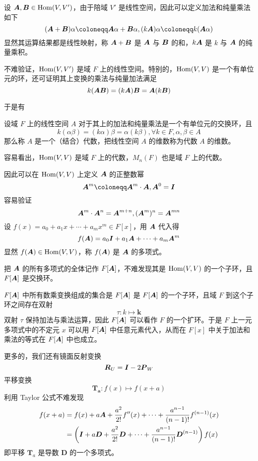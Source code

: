 设 $\boldsymbol{A},\boldsymbol{B} \in \operatorname{Hom} (V,V')$，由于陪域 $V'$ 是线性空间，因此可以定义加法和纯量乘法如下
\[ (\bfA + \bfB) \alpha \coloneqq \bfA\alpha + \bfB\alpha, (k\bfA)\alpha \coloneqq k(\bfA \alpha) \]
显然其运算结果都是线性映射，称 $\boldsymbol{A} + \boldsymbol{B}$ 是 $\boldsymbol{A}$ 与 $\boldsymbol{B}$ 的和，$k\boldsymbol{A}$ 是 $k$ 与 $\boldsymbol{A}$ 的纯量乘积。

不难验证，$\operatorname{Hom}(V,V')$ 是域 $F$ 上的线性空间。特别的，$\operatorname{Hom}(V,V)$ 是一个有单位元的环，还可证明其上变换的乘法与纯量加法满足
\[ k(\boldsymbol{A}\boldsymbol{B}) = (k\boldsymbol{A})\boldsymbol{B} = \boldsymbol{A}(k\boldsymbol{B}) \]

于是有

\begin{definition}[代数]
    设域 $F$ 上的线性空间 $A$ 对于其上的加法和纯量乘法是一个有单位元的交换环，且
    \[ k(\alpha \beta) = (k\alpha)\beta = \alpha(k\beta), \forall k \in F,\alpha,\beta \in A \]
    那么称 $A$ 是一个（结合）代数，把线性空间 $A$ 的维数称为代数 $A$ 的维数。
\end{definition}

容易看出，$\operatorname{Hom}(V,V)$ 是域 $F$ 上的代数，$M_n(F)$ 也是域 $F$ 上的代数。

因此可以在 $\operatorname{Hom}(V,V)$ 上定义 $\boldsymbol{A}$ 的正整数幂
\[ \bfA^m \coloneqq \bfA^m \cdot \bfA, \bfA^0 = \bfI \]
容易验证
\[ \boldsymbol{A}^m \cdot \boldsymbol{A}^n = \boldsymbol{A}^{m+n}, (\boldsymbol{A}^m)^n = \boldsymbol{A}^{mn} \]
设 $f(x) = a_0 + a_1 x + \cdots + a_mx^m \in F[x]$，用 $\boldsymbol{A}$ 代入得
\[ f(\boldsymbol{A}) = a_0\boldsymbol{I} + a_1\boldsymbol{A} + \cdots + a_m \boldsymbol{A}^m \]
显然 $f(\boldsymbol{A}) \in \operatorname{Hom}(V,V)$，称 $f(\boldsymbol{A})$ 是 $\boldsymbol{A}$ 的多项式。

把 $\boldsymbol{A}$ 的所有多项式的全体记作 $F[\boldsymbol{A}]$，不难发现其是 $\operatorname{Hom}(V,V)$ 的一个子环，且 $F[\boldsymbol{A}]$ 是交换环。

$F[\boldsymbol{A}]$ 中所有数乘变换组成的集合是 $F[\boldsymbol{A}]$ 是 $F[\boldsymbol{A}]$ 的一个子环，且域 $F$ 到这个子环之间存在双射
\[ \tau : k \mapsto \boldsymbol{k} \]
双射 $\tau$ 保持加法与乘法运算，因此 $F[\boldsymbol{A}]$ 可以看作 $F$ 的一个扩环。于是 $F$ 上一元多项式中的不定元 $x$ 可以用 $F[\boldsymbol{A}]$ 中任意元素代入，从而在 $F[x]$ 中关于加法和乘法的等式在 $F[\boldsymbol{A}]$ 中也成立。

更多的，我们还有镜面反射变换
\[ \boldsymbol{R}_U = \boldsymbol{I} - 2\boldsymbol{P}_W \]
平移变换
\[ \boldsymbol{T_a} : f(x) \mapsto f(x+a) \]
利用 Taylor 公式不难发现
\begin{equation*}
    \begin{aligned}
        f(x+a) & = f(x) + a\boldsymbol{A} + \frac{a^2}{2!}f''(x) + \cdots + \frac{a^{n-1}}{(n-1)!} f^{(n-1)}(x)                                                 \\
               & = \left( \boldsymbol{I} + a\boldsymbol{D} + \frac{a^2}{2!}\boldsymbol{D} + \cdots + \frac{a^{n-1}}{(n-1)!} \boldsymbol{D}^{(n-1)} \right)f(x)
    \end{aligned}
\end{equation*}
即平移 $\boldsymbol{T}_a$ 是导数 $\boldsymbol{D}$ 的一个多项式。

